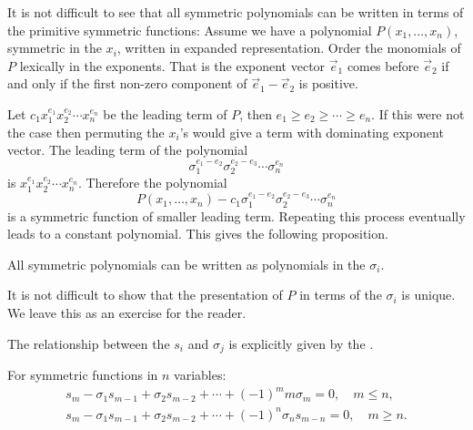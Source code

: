 It is not difficult to see that all symmetric polynomials can be
written in terms of the primitive symmetric functions:  Assume we have
a polynomial $P(x_1, \ldots, x_n)$, symmetric in the $x_i$, written
in expanded representation.  Order the monomials of $P$ lexically in
the exponents.  That is the exponent vector $\vec{e}_1$ comes before
$\vec{e}_2$ if and only if the first non-zero component of $\vec{e}_1
- \vec{e}_2$ is positive.

Let $c_1 x_1^{e_1} x_2^{e_2} \cdots x_n^{e_n}$ be the leading term of
$P$,  then $e_1 \ge e_2 \ge \cdots \ge e_n$.  If this were not the
case then permuting the $x_i$'s would give a term with dominating
exponent vector.  The leading term of the polynomial 
\[
\sigma_1^{e_1 - e_2} \sigma_2^{e_2 - e_3} \cdots \sigma_n^{e_n}
\]
is $x_1^{e_1} x_2^{e_2} \cdots x_n^{e_n}$.  Therefore the polynomial 
\[
P(x_1, \ldots, x_n) - c_1 \sigma_1^{e_1 - e_2} \sigma_2^{e_2 - e_3}
\cdots \sigma_n^{e_n}
\]
is a symmetric function of smaller leading term.  Repeating this
process eventually leads to a constant polynomial.  This gives the
following proposition.  

\begin{proposition}
All symmetric polynomials can be written as polynomials in the
$\sigma_i$.
\end{proposition}

\noindent
It is not difficult to show that the presentation of $P$ in terms of
the $\sigma_i$ is unique.  We leave this as an exercise for the
reader. 


\medskip
The relationship between the $s_i$ and $\sigma_j$ is explicitly given
by the .
\begin{proposition} \label{Newton:Ident:Prop}
For symmetric functions in $n$ variables:
\begin{align}
s_m - \sigma_1 s_{m-1} + \sigma_2 s_{m-2} + \cdots + (-1)^m m \sigma_m
  = 0, \quad m \le n, \label{Newton:Ident:Eqa}\\
s_m - \sigma_1 s_{m-1} + \sigma_2 s_{m-2} + \cdots + (-1)^n
    \sigma_{n} s_{m-n} 
  = 0, \quad m \ge n. \label{Newton:Ident:Eqb}
\end{align}

\end{proposition}

